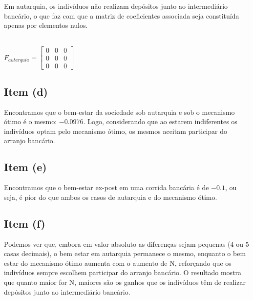\documentclass{article}
\begin{document}
Em autarquia, os indivíduos não realizam depósitos junto ao intermediário bancário, o que faz com que a matriz de coeficientes associada seja constituída apenas por elementos nulos.
\\
\\
\begin{center}

$F_{autarquia}
=
\begin{bmatrix}
    0 & 0 & 0  \\
    0 & 0 & 0 \\
    0 & 0 & 0
\end{bmatrix}
$

\end{center}



\subsection*{Item (d)}

Encontramos que o bem-estar da sociedade sob autarquia e sob o mecanismo ótimo é o mesmo: $-0.0976$. Logo, considerando que ao estarem indiferentes os indivíduos optam pelo mecanismo ótimo, os mesmos aceitam participar do arranjo bancário. 

\subsection*{Item (e)}

Encontramos que o bem-estar ex-post em uma corrida bancária é de $-0.1$, ou seja, é pior do que ambos os casos de autarquia e do mecanismo ótimo. 


\subsection*{Item (f)}

Podemos ver que, embora em valor absoluto as diferenças sejam pequenas (4 ou 5 casas decimais), o bem estar em autarquia permanece o mesmo, enquanto o bem estar do mecanismo ótimo aumenta com o aumento de N, reforçando que os indivíduos sempre escolhem participar do arranjo bancário. O resultado mostra que quanto maior for N, maiores são os ganhos que os indivíduos têm de realizar depósitos junto ao intermediário bancário.
\end{document}
